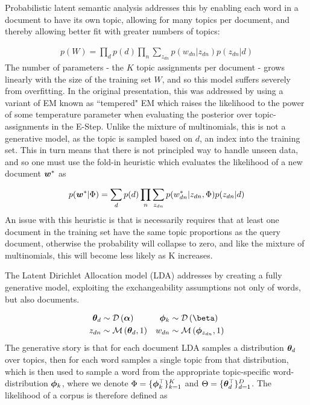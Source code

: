 Probabilistic latent semantic analysis\cite{Hofmann1999a} addresses this by enabling each word in a document to have its own topic, allowing for many topics per document, and thereby allowing better fit with greater numbers of topics:

\begin{align}
p(W) = \prod_d p(d) \prod_n \sum_{z_{dn}} p(w_{dn}|z_{dn})p(z_{dn}|d)
\end{align}
The number of parameters - the $K$ topic assignments per document - grows linearly with the size of the training set $W$, and so this model suffers severely from overfitting. In the original presentation, this was addressed by using a variant of EM known as ``tempered" EM which raises the likelihood to the power of some temperature parameter when evaluating the posterior over topic-assignments in the E-Step. Unlike the mixture of multinomials, this is not a generative model, as the topic is sampled based on $d$, an index into the training set. This in turn means that there is not principled way to handle unseen data, and so one must use the fold-in heuristic which evaluates the likelihood of a new document $\bm w^*$ as

\begin{align}
p(\bm w^*|\Phi) = \sum_d p(d) \prod_n \sum_{z_{dn}} p(w_{dn}^*|z_{dn}, \Phi) p(z_{dn}|d)
\end{align}
An issue with this heuristic is that is necessarily requires that at least one document in the training set have the same topic proportions as the query document, otherwise the probability will collapse to zero, and like the mixture of multinomials, this will become less likely as K increases.

The Latent Dirichlet Allocation model\cite{BleiNgJordan2003} (LDA) addresses by creating a fully generative model, exploiting the exchangeability assumptions not only of words, but also documents.

\begin{align}
\thd & \sim \dir{\vv{\alpha}} & \pk & \sim \dir{\vv{\beta}} \\
z_{dn} & \sim \muln{\thd}{1} & w_{dn} & \sim \muln{\vv{\phi}_{z_{dn}}}{1}
\end{align}
The generative story is that for each document LDA samples a distribution ${ \bm \theta_d }$ over topics, then for each word samples a single topic from that distribution, which is then used to sample a word from the appropriate topic-specific word-distribution ${ \bm \phi_k }$, where we denote $\Phi = \{ \bm \phi_k^\top \}_{k=1}^K$ and $\Theta = \{ \bm \theta_d^\top \}_{d=1}^D$. The likelihood of a corpus is therefore defined as

